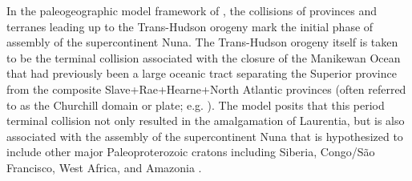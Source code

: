 \documentclass[11pt,letterpaper]{article}
\begin{document}
In the paleogeographic model framework of \cite{Pehrsson2015a}, the collisions of provinces and terranes leading up to the Trans-Hudson orogeny mark the initial phase of assembly of the supercontinent Nuna. The Trans-Hudson orogeny itself is taken to be the terminal collision associated with the closure of the Manikewan Ocean that had previously been a large oceanic tract separating the Superior province from the composite Slave+Rae+Hearne+North Atlantic provinces (often referred to as the Churchill domain or plate; e.g. \citealp{Skipton2016a, Weller2017a}). The \cite{Pehrsson2015a} model posits that this period terminal collision not only resulted in the amalgamation of Laurentia, but is also associated with the assembly of the supercontinent Nuna that is hypothesized to include other major Paleoproterozoic cratons including Siberia, Congo/S\~ao Francisco, West Africa, and Amazonia \citep{Whitmeyer2007a, Pehrsson2015a}. 
\end{document}

